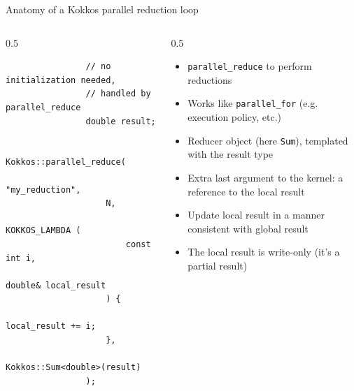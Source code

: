 \documentclass[
    aspectratio=169,
    \createHandout
]{beamer}
\begin{document}
\begin{frame}[fragile]{Anatomy of a Kokkos parallel reduction loop}
    \begin{columns}
        \begin{column}{0.5\linewidth}
            \begin{verbatim}
                // no initialization needed,
                // handled by parallel_reduce
                double result;

                Kokkos::parallel_reduce(
                    "my_reduction",
                    N,
                    KOKKOS_LAMBDA (
                        const int i,
                        double& local_result
                    ) {
                        local_result += i;
                    },
                    Kokkos::Sum<double>(result)
                );
            \end{verbatim}
        \end{column}
        \begin{column}{0.5\linewidth}
            \begin{itemize}
                \item \texttt{parallel_reduce} to perform reductions
                \item Works like \texttt{parallel\_for} (e.g. execution policy, etc.)
                \item Reducer object (here \texttt{Sum}), templated with the result type
                \item Extra last argument to the kernel: a reference to the local result
                \item Update local result in a manner consistent with global result
                \item The local result is write-only (it's a partial result)
            \end{itemize}
        \end{column}
    \end{columns}
\end{frame}

\end{document}

